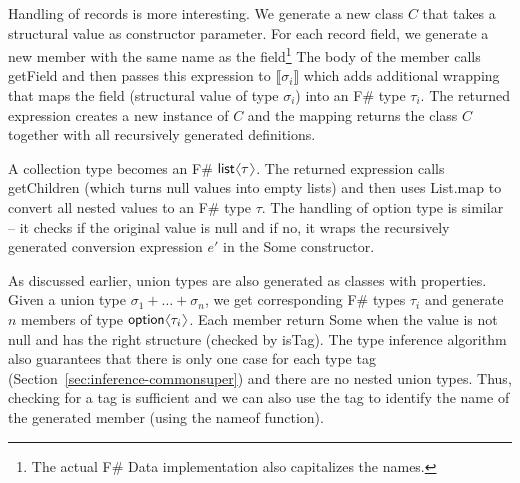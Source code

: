 \documentclass[10pt,preprint,clearpagebib]{sigplanconf}
\newcommand{\langl}{\begin{picture}(4.5,7)
\put(1.1,2.5){\rotatebox{60}{\line(1,0){5.5}}}
\put(1.1,2.5){\rotatebox{300}{\line(1,0){5.5}}}
\end{picture}}
\newcommand{\rangl}{\begin{picture}(4.5,7)
\put(.9,2.5){\rotatebox{120}{\line(1,0){5.5}}}
\put(.9,2.5){\rotatebox{240}{\line(1,0){5.5}}}
\end{picture}}
\newcommand{\kvd}[1]{\textnormal{\textcolor{kvdclr}{\sffamily #1}}}
\newcommand{\ident}[1]{\textnormal{\sffamily #1}}
\newcommand{\sem}[1]{\llbracket #1 \rrbracket}
\begin{document}
Handling of records is more interesting. We generate a new class $C$ that takes a structural value as constructor
parameter. For each record field, we generate a new member with the same name as the field\footnote{The actual
F\# Data implementation also capitalizes the names.} The body of the member calls \ident{getField} and then
passes this expression to $\sem{\sigma_i}$ which adds additional wrapping that maps the field (structural value
of type $\sigma_i$) into an F\# type $\tau_i$. The returned expression creates a new instance of $C$ and
the mapping returns the class $C$ together with all recursively generated definitions.

A collection type becomes an F\# $\ident{list}\langl\tau\rangl$. The returned expression calls \ident{getChildren}
(which turns \kvd{null} values into empty lists) and then uses \ident{List.map} to convert all nested values to 
an F\# type $\tau$. The handling of option type is similar -- it checks if the original value is \kvd{null} and
if no, it wraps the recursively generated conversion expression $e'$ in the \ident{Some} constructor.

As discussed earlier, union types are also generated as classes with properties. Given a union type $\sigma_1 + \ldots + \sigma_n$,
we get corresponding F\# types $\tau_i$ and generate $n$ members of type $\ident{option}\langl \tau_i\rangl$.
Each member return \ident{Some} when the value is not \kvd{null} and has the right structure (checked by 
\ident{isTag}). The type inference algorithm also guarantees that there is only one case for each type tag 
(Section~\ref{sec:inference-commonsuper}) and there are no nested union types. Thus, checking for a tag is
sufficient and we can also use the tag to identify the name of the generated member (using the
\ident{nameof} function).
\end{document}
